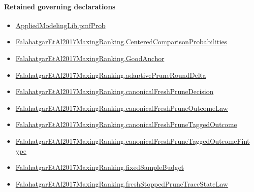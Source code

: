 \documentclass[10pt]{article}
\begin{document}
\paragraph{Retained governing declarations}
\begin{itemize}\raggedright
\item \hyperlink{governing-declaration-9c38d53b9d664221}{Applied\allowbreak{}Modeling\allowbreak{}Lib.\allowbreak{}pmf\allowbreak{}Prob}
\item \hyperlink{paper-prerequisite-b99b697ef57f53ce}{Falahatgar\allowbreak{}Et\allowbreak{}Al2017\allowbreak{}Maxing\allowbreak{}Ranking.\allowbreak{}Centered\allowbreak{}Comparison\allowbreak{}Probabilities}
\item \hyperlink{paper-prerequisite-46128be8e1edb4b6}{Falahatgar\allowbreak{}Et\allowbreak{}Al2017\allowbreak{}Maxing\allowbreak{}Ranking.\allowbreak{}Good\allowbreak{}Anchor}
\item \hyperlink{governing-declaration-0a2d9c4ad2e46f08}{Falahatgar\allowbreak{}Et\allowbreak{}Al2017\allowbreak{}Maxing\allowbreak{}Ranking.\allowbreak{}adaptive\allowbreak{}Prune\allowbreak{}Round\allowbreak{}Delta}
\item \hyperlink{governing-declaration-5f4aa5a2143dcc9f}{Falahatgar\allowbreak{}Et\allowbreak{}Al2017\allowbreak{}Maxing\allowbreak{}Ranking.\allowbreak{}canonical\allowbreak{}Fresh\allowbreak{}Prune\allowbreak{}Decision}
\item \hyperlink{governing-declaration-2d276a1a3b14a7e3}{Falahatgar\allowbreak{}Et\allowbreak{}Al2017\allowbreak{}Maxing\allowbreak{}Ranking.\allowbreak{}canonical\allowbreak{}Fresh\allowbreak{}Prune\allowbreak{}Outcome\allowbreak{}Law}
\item \hyperlink{governing-declaration-3a0933a8178fc16e}{Falahatgar\allowbreak{}Et\allowbreak{}Al2017\allowbreak{}Maxing\allowbreak{}Ranking.\allowbreak{}canonical\allowbreak{}Fresh\allowbreak{}Prune\allowbreak{}Tagged\allowbreak{}Outcome}
\item \hyperlink{governing-declaration-6e0ce93b44515012}{Falahatgar\allowbreak{}Et\allowbreak{}Al2017\allowbreak{}Maxing\allowbreak{}Ranking.\allowbreak{}canonical\allowbreak{}Fresh\allowbreak{}Prune\allowbreak{}Tagged\allowbreak{}Outcome\allowbreak{}Fintype}
\item \hyperlink{governing-declaration-4b4daf4bb2493573}{Falahatgar\allowbreak{}Et\allowbreak{}Al2017\allowbreak{}Maxing\allowbreak{}Ranking.\allowbreak{}fixed\allowbreak{}Sample\allowbreak{}Budget}
\item \hyperlink{paper-prerequisite-2c688a8303bceb83}{Falahatgar\allowbreak{}Et\allowbreak{}Al2017\allowbreak{}Maxing\allowbreak{}Ranking.\allowbreak{}fresh\allowbreak{}Stopped\allowbreak{}Prune\allowbreak{}Trace\allowbreak{}State\allowbreak{}Law}

\end{itemize}
\end{document}
